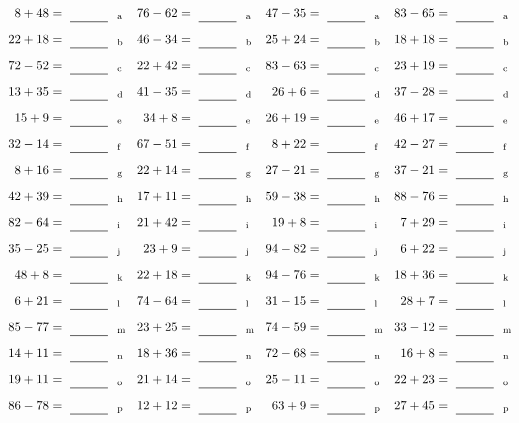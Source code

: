 \documentclass
[
  draft    = true,
  fontsize = 11pt,
  parskip  = half-
]
{scrartcl}
\begin{document}
\clearpage
\begin{align*}
    \pline{8+48}&=\rline{a}
  & \pline{76-62}&=\rline{a}
  & \pline{47-35}&=\rline{a}
  & \pline{83-65}&=\rline{a} \\[1ex]
    \pline{22+18}&=\rline{b}
  & \pline{46-34}&=\rline{b}
  & \pline{25+24}&=\rline{b}
  & \pline{18+18}&=\rline{b} \\[1ex]
    \pline{72-52}&=\rline{c}
  & \pline{22+42}&=\rline{c}
  & \pline{83-63}&=\rline{c}
  & \pline{23+19}&=\rline{c} \\[1ex]
    \pline{13+35}&=\rline{d}
  & \pline{41-35}&=\rline{d}
  & \pline{26+6}&=\rline{d}
  & \pline{37-28}&=\rline{d} \\[1ex]
    \pline{15+9}&=\rline{e}
  & \pline{34+8}&=\rline{e}
  & \pline{26+19}&=\rline{e}
  & \pline{46+17}&=\rline{e} \\[1ex]
    \pline{32-14}&=\rline{f}
  & \pline{67-51}&=\rline{f}
  & \pline{8+22}&=\rline{f}
  & \pline{42-27}&=\rline{f} \\[1ex]
    \pline{8+16}&=\rline{g}
  & \pline{22+14}&=\rline{g}
  & \pline{27-21}&=\rline{g}
  & \pline{37-21}&=\rline{g} \\[1ex]
    \pline{42+39}&=\rline{h}
  & \pline{17+11}&=\rline{h}
  & \pline{59-38}&=\rline{h}
  & \pline{88-76}&=\rline{h} \\[1ex]
    \pline{82-64}&=\rline{i}
  & \pline{21+42}&=\rline{i}
  & \pline{19+8}&=\rline{i}
  & \pline{7+29}&=\rline{i} \\[1ex]
    \pline{35-25}&=\rline{j}
  & \pline{23+9}&=\rline{j}
  & \pline{94-82}&=\rline{j}
  & \pline{6+22}&=\rline{j} \\[1ex]
    \pline{48+8}&=\rline{k}
  & \pline{22+18}&=\rline{k}
  & \pline{94-76}&=\rline{k}
  & \pline{18+36}&=\rline{k} \\[1ex]
    \pline{6+21}&=\rline{l}
  & \pline{74-64}&=\rline{l}
  & \pline{31-15}&=\rline{l}
  & \pline{28+7}&=\rline{l} \\[1ex]
    \pline{85-77}&=\rline{m}
  & \pline{23+25}&=\rline{m}
  & \pline{74-59}&=\rline{m}
  & \pline{33-12}&=\rline{m} \\[1ex]
    \pline{14+11}&=\rline{n}
  & \pline{18+36}&=\rline{n}
  & \pline{72-68}&=\rline{n}
  & \pline{16+8}&=\rline{n} \\[1ex]
    \pline{19+11}&=\rline{o}
  & \pline{21+14}&=\rline{o}
  & \pline{25-11}&=\rline{o}
  & \pline{22+23}&=\rline{o} \\[1ex]
    \pline{86-78}&=\rline{p}
  & \pline{12+12}&=\rline{p}
  & \pline{63+9}&=\rline{p}
  & \pline{27+45}&=\rline{p}
\end{align*}
\end{document}
